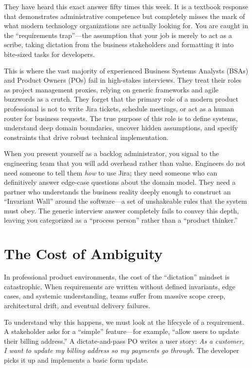 They have heard this exact answer fifty times this week. It is a
textbook response that demonstrates administrative competence but
completely misses the mark of what modern technology organizations are
actually looking for. You are caught in the ``requirements trap''---the
assumption that your job is merely to act as a scribe, taking dictation
from the business stakeholders and formatting it into bite-sized tasks
for developers.

This is where the vast majority of experienced Business Systems Analysts
(BSAs) and Product Owners (POs) fail in high-stakes interviews. They
treat their roles as project management proxies, relying on generic
frameworks and agile buzzwords as a crutch. They forget that the primary
role of a modern product professional is not to write Jira tickets,
schedule meetings, or act as a human router for business requests. The
true purpose of this role is to define systems, understand deep domain
boundaries, uncover hidden assumptions, and specify constraints that
drive robust technical implementation.

When you present yourself as a backlog administrator, you signal to the
engineering team that you will add overhead rather than value. Engineers
do not need someone to tell them \emph{how} to use Jira; they need
someone who can definitively answer edge-case questions about the domain
model. They need a partner who understands the business reality deeply
enough to construct an ``Invariant Wall'' around the software---a set of
unshakeable rules that the system must obey. The generic interview
answer completely fails to convey this depth, leaving you categorized as
a ``process person'' rather than a ``product thinker.''

\section{The Cost of Ambiguity}\label{the-cost-of-ambiguity}

In professional product environments, the cost of the ``dictation''
mindset is catastrophic. When requirements are written without defined
invariants, edge cases, and systemic understanding, teams suffer from
massive scope creep, architectural drift, and eventual delivery
failures.

To understand why this happens, we must look at the lifecycle of a
requirement. A stakeholder asks for a ``simple'' feature---for example,
``allow users to update their billing address.'' A dictate-and-pass PO
writes a user story: \emph{As a customer, I want to update my billing
address so my payments go through.} The developer picks it up and
implements a basic form update.

